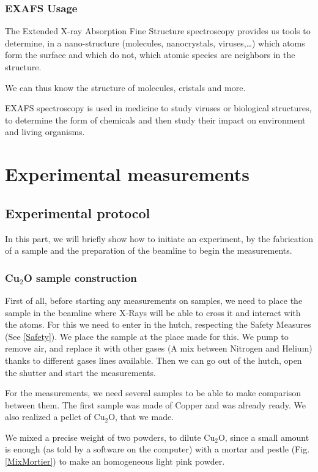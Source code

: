 \documentclass[11pt,a4paper,oneside]{report}
\begin{document}
\subsection{EXAFS Usage}
The Extended X-ray Absorption Fine Structure spectroscopy provides us tools to determine, in a nano-structure (molecules, nanocrystals, viruses,…) which atoms form the surface and which do not, which atomic species are neighbors in the structure.

We can thus know the structure of molecules, cristals and more.

EXAFS spectroscopy is used in medicine to study viruses or biological structures, to determine the form of chemicals and then study their impact on environment and living organisms.




\newpage
\chapter{Experimental measurements}

\section{Experimental protocol}
In this part, we will briefly show how to initiate an experiment, by the fabrication of a sample and the preparation of the beamline to begin the measurements.


\subsection{Cu$_2$O sample construction}
First of all, before starting any measurements on samples, we need to place the sample in the beamline where X-Rays will be able to cross it and interact with the atoms. For this we need to enter in the hutch, respecting the Safety Measures (See \ref{Safety}). We place the sample at the place made for this. We pump to remove air, and replace it with other gases (A mix between Nitrogen and Helium) thanks to different gases lines available. Then we can go out of the hutch, open the shutter and start the measurements.

For the measurements, we need several samples to be able to make comparison between them. The first sample was made of Copper and was already ready. We also realized a pellet of Cu$_2$O, that we made.

 We mixed a precise weight of two powders, to dilute Cu$_2$O, since a small amount is enough (as told by a software on the computer) with a mortar and pestle (Fig. \ref{MixMortier}) to make an homogeneous light pink powder.
\end{document}
